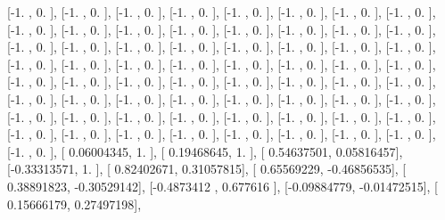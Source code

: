 \documentclass{article}
\begin{document}
       [-1.        ,  0.        ],
       [-1.        ,  0.        ],
       [-1.        ,  0.        ],
       [-1.        ,  0.        ],
       [-1.        ,  0.        ],
       [-1.        ,  0.        ],
       [-1.        ,  0.        ],
       [-1.        ,  0.        ],
       [-1.        ,  0.        ],
       [-1.        ,  0.        ],
       [-1.        ,  0.        ],
       [-1.        ,  0.        ],
       [-1.        ,  0.        ],
       [-1.        ,  0.        ],
       [-1.        ,  0.        ],
       [-1.        ,  0.        ],
       [-1.        ,  0.        ],
       [-1.        ,  0.        ],
       [-1.        ,  0.        ],
       [-1.        ,  0.        ],
       [-1.        ,  0.        ],
       [-1.        ,  0.        ],
       [-1.        ,  0.        ],
       [-1.        ,  0.        ],
       [-1.        ,  0.        ],
       [-1.        ,  0.        ],
       [-1.        ,  0.        ],
       [-1.        ,  0.        ],
       [-1.        ,  0.        ],
       [-1.        ,  0.        ],
       [-1.        ,  0.        ],
       [-1.        ,  0.        ],
       [-1.        ,  0.        ],
       [-1.        ,  0.        ],
       [-1.        ,  0.        ],
       [-1.        ,  0.        ],
       [-1.        ,  0.        ],
       [-1.        ,  0.        ],
       [-1.        ,  0.        ],
       [-1.        ,  0.        ],
       [-1.        ,  0.        ],
       [-1.        ,  0.        ],
       [-1.        ,  0.        ],
       [-1.        ,  0.        ],
       [-1.        ,  0.        ],
       [-1.        ,  0.        ],
       [-1.        ,  0.        ],
       [-1.        ,  0.        ],
       [-1.        ,  0.        ],
       [-1.        ,  0.        ],
       [-1.        ,  0.        ],
       [-1.        ,  0.        ],
       [-1.        ,  0.        ],
       [-1.        ,  0.        ],
       [-1.        ,  0.        ],
       [-1.        ,  0.        ],
       [-1.        ,  0.        ],
       [-1.        ,  0.        ],
       [-1.        ,  0.        ],
       [-1.        ,  0.        ],
       [-1.        ,  0.        ],
       [-1.        ,  0.        ],
       [-1.        ,  0.        ],
       [-1.        ,  0.        ],
       [-1.        ,  0.        ],
       [ 0.06004345,  1.        ],
       [ 0.19468645,  1.        ],
       [ 0.54637501,  0.05816457],
       [-0.33313571,  1.        ],
       [ 0.82402671,  0.31057815],
       [ 0.65569229, -0.46856535],
       [ 0.38891823, -0.30529142],
       [-0.4873412 ,  0.677616  ],
       [-0.09884779, -0.01472515],
       [ 0.15666179,  0.27497198],
\end{document}
